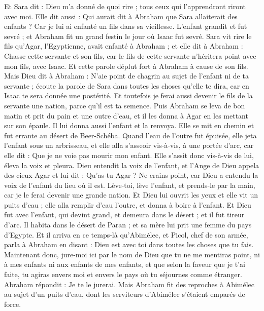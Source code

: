 \begin{multicols}{2}
Et Sara dit : Dieu m'a donné de quoi rire ; tous ceux qui l'apprendront riront avec moi.
Elle dit aussi : Qui aurait dit à Abraham que Sara allaiterait des enfants ? Car je lui ai enfanté un fils dans sa vieillesse.
L'enfant grandit et fut sevré ; et Abraham fit un grand festin le jour où Isaac fut sevré.
Sara vit rire le fils qu'Agar, l'Egyptienne, avait enfanté à Abraham ;
et elle dit à Abraham : Chasse cette servante et son fils, car le fils de cette servante n'héritera point avec mon fils, avec Isaac.
Et cette parole déplut fort à Abraham à cause de son fils.
Mais Dieu dit à Abraham : N'aie point de chagrin au sujet de l'enfant ni de ta servante ; écoute la parole de Sara dans toutes les choses qu'elle te dira, car en Isaac te sera donnée une postérité.
Et toutefois je ferai aussi devenir le fils de la servante une nation, parce qu'il est ta semence.
Puis Abraham se leva de bon matin et prit du pain et une outre d'eau, et il les donna à Agar en les mettant sur son épaule. Il lui donna aussi l'enfant et la renvoya. Elle se mit en chemin et fut errante au désert de Beer-Schéba.
Quand l'eau de l'outre fut épuisée, elle jeta l'enfant sous un arbrisseau,
et elle alla s'asseoir vis-à-vis, à une portée d'arc, car elle dit : Que je ne voie pas mourir mon enfant. Elle s'assit donc vis-à-vis de lui, éleva la voix et pleura.
Dieu entendit la voix de l'enfant, et l'Ange de Dieu appela des cieux Agar et lui dit : Qu'as-tu Agar ? Ne crains point, car Dieu a entendu la voix de l'enfant du lieu où il est.
Lève-toi, lève l'enfant, et prends-le par la main, car je le ferai devenir une grande nation.
Et Dieu lui ouvrit les yeux et elle vit un puits d'eau ; elle alla remplir d'eau l'outre, et donna à boire à l'enfant.
Et Dieu fut avec l'enfant, qui devint grand, et demeura dans le désert ; et il fut tireur d'arc.
Il habita dans le désert de Paran ; et sa mère lui prit une femme du pays d'Egypte.
Et il arriva en ce temps-là qu'Abimélec, et Picol, chef de son armée, parla à Abraham en disant : Dieu est avec toi dans toutes les choses que tu fais.
Maintenant donc, jure-moi ici par le nom de Dieu que tu ne me mentiras point, ni à mes enfants ni aux enfants de mes enfants, et que selon la faveur que je t'ai faite, tu agiras envers moi et envers le pays où tu séjournes comme étranger.
Abraham répondit : Je te le jurerai.
Mais Abraham fit des reproches à Abimélec au sujet d'un puits d'eau, dont les serviteurs d'Abimélec s'étaient emparés de force.

\end{multicols}
